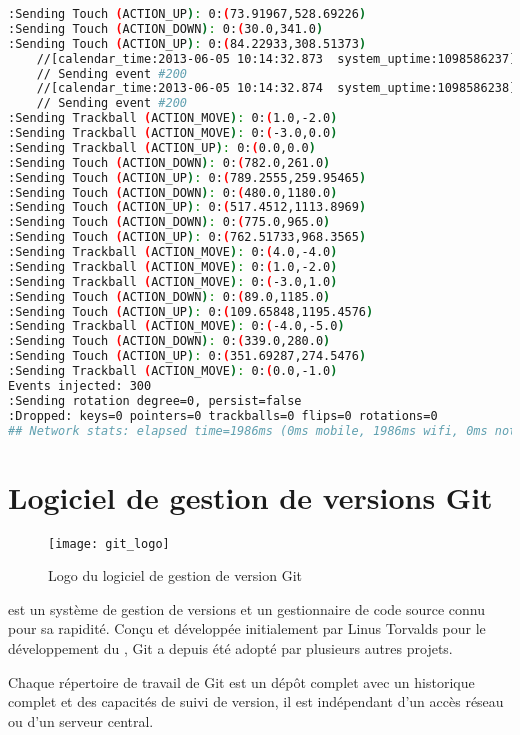 \begin{lstlisting}[language=bash, label=lst:adb_monkey, caption=Utilisation de l'UI/Application Exerciser Monkey]
:Sending Touch (ACTION_UP): 0:(73.91967,528.69226)
:Sending Touch (ACTION_DOWN): 0:(30.0,341.0)
:Sending Touch (ACTION_UP): 0:(84.22933,308.51373)
    //[calendar_time:2013-06-05 10:14:32.873  system_uptime:1098586237]
    // Sending event #200
    //[calendar_time:2013-06-05 10:14:32.874  system_uptime:1098586238]
    // Sending event #200
:Sending Trackball (ACTION_MOVE): 0:(1.0,-2.0)
:Sending Trackball (ACTION_MOVE): 0:(-3.0,0.0)
:Sending Trackball (ACTION_UP): 0:(0.0,0.0)
:Sending Touch (ACTION_DOWN): 0:(782.0,261.0)
:Sending Touch (ACTION_UP): 0:(789.2555,259.95465)
:Sending Touch (ACTION_DOWN): 0:(480.0,1180.0)
:Sending Touch (ACTION_UP): 0:(517.4512,1113.8969)
:Sending Touch (ACTION_DOWN): 0:(775.0,965.0)
:Sending Touch (ACTION_UP): 0:(762.51733,968.3565)
:Sending Trackball (ACTION_MOVE): 0:(4.0,-4.0)
:Sending Trackball (ACTION_MOVE): 0:(1.0,-2.0)
:Sending Trackball (ACTION_MOVE): 0:(-3.0,1.0)
:Sending Touch (ACTION_DOWN): 0:(89.0,1185.0)
:Sending Touch (ACTION_UP): 0:(109.65848,1195.4576)
:Sending Trackball (ACTION_MOVE): 0:(-4.0,-5.0)
:Sending Touch (ACTION_DOWN): 0:(339.0,280.0)
:Sending Touch (ACTION_UP): 0:(351.69287,274.5476)
:Sending Trackball (ACTION_MOVE): 0:(0.0,-1.0)
Events injected: 300
:Sending rotation degree=0, persist=false
:Dropped: keys=0 pointers=0 trackballs=0 flips=0 rotations=0
## Network stats: elapsed time=1986ms (0ms mobile, 1986ms wifi, 0ms not connected)

\end{lstlisting}

\chapter{Logiciel de gestion de versions Git}

\begin{figure}
\center
\texttt{[image: git\_logo]}
\caption{Logo du logiciel de gestion de version Git}
\label{fig:git}
\end{figure}

\cite{wikipedia:git} est un système de gestion de versions et un gestionnaire de code source connu pour sa rapidité. Conçu et développée initialement par \textsf{Linus Torvalds} pour le développement du  , Git a depuis été adopté par plusieurs autres projets.

Chaque répertoire de travail de Git est un dépôt complet avec un historique complet et des capacités de suivi de version, il est indépendant d'un accès réseau ou d'un serveur central.

